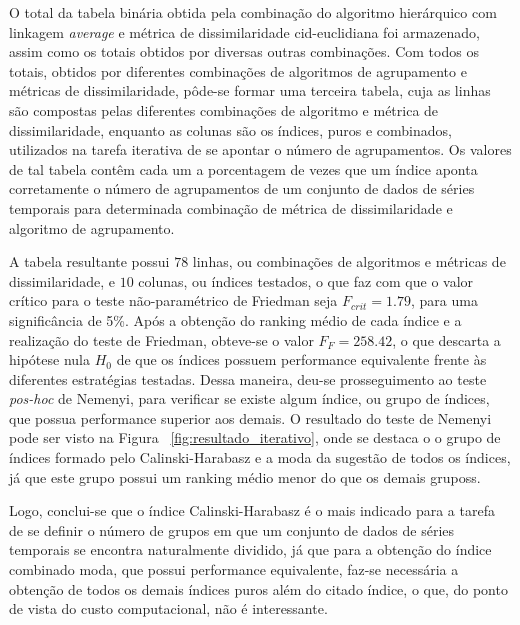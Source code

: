 O total da tabela binária obtida pela combinação do algoritmo hierárquico com linkagem \emph{average} e métrica de dissimilaridade cid-euclidiana foi armazenado, assim como os totais obtidos por diversas outras combinações. Com todos os totais, obtidos por diferentes combinações de algoritmos de agrupamento e métricas de dissimilaridade, pôde-se formar uma terceira tabela, cuja as linhas são compostas pelas diferentes combinações de algoritmo e métrica de dissimilaridade, enquanto as colunas são os índices, puros e combinados, utilizados na tarefa iterativa de se apontar o número de agrupamentos. Os valores de tal tabela contêm cada um a porcentagem de vezes que um índice aponta corretamente o número de agrupamentos de um conjunto de dados de séries temporais para determinada combinação de métrica de dissimilaridade e algoritmo de agrupamento. 

A tabela resultante possui $78$ linhas, ou combinações de algoritmos e métricas de dissimilaridade, e $10$ colunas, ou índices testados, o que faz com que o valor crítico para o teste não-paramétrico de Friedman seja $F_{crit} = 1.79$, para uma significância de 5\%. Após a obtenção do ranking médio de cada índice e a realização do teste de Friedman, obteve-se o valor $F_F = 258.42$, o que descarta a hipótese nula $H_0$ de que os índices possuem performance equivalente frente às diferentes estratégias testadas. Dessa maneira, deu-se prosseguimento ao teste \emph{pos-hoc} de Nemenyi, para verificar se existe algum índice, ou grupo de índices, que possua performance superior aos demais. O resultado do teste de Nemenyi pode ser visto na Figura ~\ref{fig:resultado_iterativo}, onde se destaca o o grupo de índices formado pelo Calinski-Harabasz e a moda da sugestão de todos os índices, já que este grupo possui um ranking médio menor do que os demais gruposs.

Logo, conclui-se que o índice Calinski-Harabasz é o mais indicado para a tarefa de se definir o número de grupos em que um conjunto de dados de séries temporais se encontra naturalmente dividido, já que para a obtenção do índice combinado moda, que possui performance equivalente, faz-se necessária a obtenção de todos os demais índices puros além do citado índice, o que, do ponto de vista do custo computacional, não é interessante.

